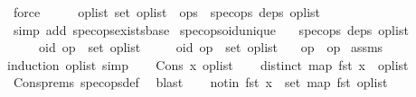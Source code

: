\begin{isabellebody}
\ force\isanewline
\ \ \isamarkupfalse%
\ \isamarkupfalse%
\ {\isachardoublequoteopen}{\isasymexists}op{\isacharunderscore}list{\isachardot}\ set\ op{\isacharunderscore}list\ {\isacharequal}\ ops\ {\isasymand}\ spec{\isacharunderscore}ops\ deps\ op{\isacharunderscore}list{\isachardoublequoteclose}\isanewline
\ \ \ \ \isamarkupfalse%
\ {\isacharparenleft}simp\ add{\isacharcolon}\ spec{\isacharunderscore}ops{\isacharunderscore}exists{\isacharunderscore}base{\isacharparenright}\isanewline
{}\isamarkupfalse%
%
\endisatagproof
{\isafoldproof}%
%
\isadelimproof
\isanewline
%
\endisadelimproof
\isanewline
{}\isamarkupfalse%
\ spec{\isacharunderscore}ops{\isacharunderscore}oid{\isacharunderscore}unique{\isacharcolon}\isanewline
\ \ \ {\isachardoublequoteopen}spec{\isacharunderscore}ops\ deps\ op{\isacharunderscore}list{\isachardoublequoteclose}\isanewline
\ \ \ \ \ {\isachardoublequoteopen}{\isacharparenleft}oid{\isacharcomma}\ op{}{\isacharparenright}\ {\isasymin}\ set\ op{\isacharunderscore}list{\isachardoublequoteclose}\isanewline
\ \ \ \ \ {\isachardoublequoteopen}{\isacharparenleft}oid{\isacharcomma}\ op{}{\isacharparenright}\ {\isasymin}\ set\ op{\isacharunderscore}list{\isachardoublequoteclose}\isanewline
\ \ \ {\isachardoublequoteopen}op{}\ {\isacharequal}\ op{}{\isachardoublequoteclose}\isanewline
%
\isadelimproof
%
\endisadelimproof
%
\isatagproof
{}\isamarkupfalse%
\ assms\ \isamarkupfalse%
{\isacharparenleft}induction\ op{\isacharunderscore}list{\isacharcomma}\ simp{\isacharparenright}\isanewline
\ \ \isamarkupfalse%
\ {\isacharparenleft}Cons\ x\ op{\isacharunderscore}list{\isacharparenright}\isanewline
\ \ \isamarkupfalse%
\ {\isachardoublequoteopen}distinct\ {\isacharparenleft}map\ fst\ {\isacharparenleft}x\ {\isacharhash}\ op{\isacharunderscore}list{\isacharparenright}{\isacharparenright}{\isachardoublequoteclose}\isanewline
\ \ \ \ \isamarkupfalse%
\ Cons{\isachardot}prems{\isacharparenleft}{}{\isacharparenright}\ spec{\isacharunderscore}ops{\isacharunderscore}def\ \isamarkupfalse%
\ blast\isanewline
\ \ \isamarkupfalse%
\ notin{\isacharcolon}\ {\isachardoublequoteopen}fst\ x\ {\isasymnotin}\ set\ {\isacharparenleft}map\ fst\ op{\isacharunderscore}list{\isacharparenright}{\isachardoublequoteclose}\isanewline
\ \ \ \ \isamarkupfalse%

\end{isabellebody}
